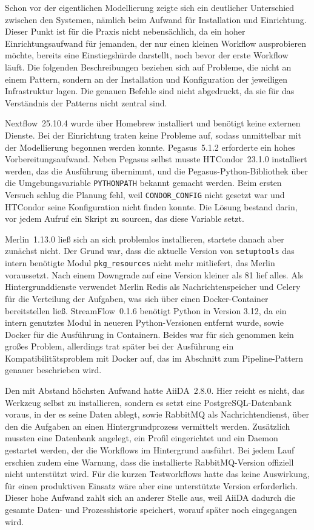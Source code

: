 Schon vor der eigentlichen Modellierung zeigte sich ein deutlicher Unterschied zwischen den
Systemen, nämlich beim Aufwand für Installation und Einrichtung. Dieser Punkt ist für die Praxis
nicht nebensächlich, da ein hoher Einrichtungsaufwand für jemanden, der nur einen kleinen Workflow
ausprobieren möchte, bereits eine Einstiegshürde darstellt, noch bevor der erste Workflow läuft.
Die folgenden Beschreibungen beziehen sich auf Probleme, die nicht an einem Pattern, sondern an
der Installation und Konfiguration der jeweiligen Infrastruktur lagen. Die genauen Befehle sind
nicht abgedruckt, da sie für das Verständnis der Patterns nicht zentral sind.

Nextflow~25.10.4 wurde über Homebrew installiert und benötigt keine externen Dienste. Bei der
Einrichtung traten keine Probleme auf, sodass unmittelbar mit der Modellierung begonnen werden
konnte. Pegasus~5.1.2 erforderte ein hohes Vorbereitungsaufwand. Neben Pegasus selbst musste
HTCondor~23.1.0 installiert werden, das die Ausführung übernimmt, und die Pegasus-Python-Bibliothek
über die Umgebungsvariable \texttt{PYTHONPATH} bekannt gemacht werden. Beim ersten Versuch schlug
die Planung fehl, weil \texttt{CONDOR\_CONFIG} nicht gesetzt war und HTCondor seine Konfiguration
nicht finden konnte. Die Lösung bestand darin, vor jedem Aufruf ein Skript zu sourcen, das diese
Variable setzt.

Merlin~1.13.0 ließ sich an sich problemlos installieren, startete danach aber zunächst nicht. Der
Grund war, dass die aktuelle Version von \texttt{setuptools} das intern benötigte Modul
\texttt{pkg\_resources} nicht mehr mitliefert, das Merlin voraussetzt. Nach einem Downgrade auf
eine Version kleiner als 81 lief alles. Als Hintergrunddienste verwendet Merlin Redis als
Nachrichtenspeicher und Celery für die Verteilung der Aufgaben, was sich über einen
Docker-Container bereitstellen ließ. StreamFlow~0.1.6 benötigt Python in Version 3.12, da ein
intern genutztes Modul in neueren Python-Versionen entfernt wurde, sowie Docker für die Ausführung
in Containern. Beides war für sich genommen kein großes Problem, allerdings trat später bei der
Ausführung ein Kompatibilitätsproblem mit Docker auf, das im Abschnitt zum Pipeline-Pattern
genauer beschrieben wird.

Den mit Abstand höchsten Aufwand hatte AiiDA~2.8.0. Hier reicht es nicht, das Werkzeug selbst zu
installieren, sondern es setzt eine PostgreSQL-Datenbank voraus, in der es seine Daten ablegt,
sowie RabbitMQ als Nachrichtendienst, über den die Aufgaben an einen Hintergrundprozess vermittelt
werden. Zusätzlich mussten eine Datenbank angelegt, ein Profil eingerichtet und ein Daemon
gestartet werden, der die Workflows im Hintergrund ausführt. Bei jedem Lauf erschien zudem eine
Warnung, dass die installierte RabbitMQ-Version offiziell nicht unterstützt wird. Für die kurzen
Testworkflows hatte das keine Auswirkung, für einen produktiven Einsatz wäre aber eine
unterstützte Version erforderlich. Dieser hohe Aufwand zahlt sich an anderer Stelle aus, weil
AiiDA dadurch die gesamte Daten- und Prozesshistorie speichert, worauf später noch eingegangen
wird.


